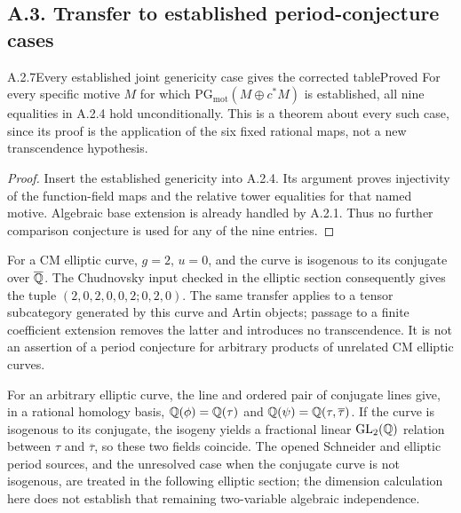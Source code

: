 \subsection{A.3. Transfer to established period-conjecture cases}

\begin{result}{A.2.7}{Every established joint genericity case gives the corrected table}{Proved}
For every specific motive $M$ for which
$\mathrm{PG}_{\mathrm{mot}}(M\oplus c^*M)$ is established, all nine
equalities in A.2.4 hold unconditionally. This is a theorem about
every such case, since its proof is the application of the six
fixed rational maps, not a new transcendence hypothesis.
\end{result}
\begin{proof}
Insert the established genericity into A.2.4. Its argument proves
injectivity of the function-field maps and the relative tower
equalities for that named motive. Algebraic base extension is
already handled by A.2.1. Thus no further comparison conjecture
is used for any of the nine entries.
\end{proof}

For a CM elliptic curve, $g=2$, $u=0$, and the curve is isogenous
to its conjugate over $\overline{\mathbb Q}$. The Chudnovsky input checked in the
elliptic section consequently gives the tuple
$(2,0,2,0,0,2;0,2,0)$. The same transfer applies to a tensor
subcategory generated by this curve and Artin objects; passage to
a finite coefficient extension removes the latter and introduces
no transcendence. It is not an assertion of a period conjecture
for arbitrary products of unrelated CM elliptic curves.

For an arbitrary elliptic curve, the line and ordered pair of
conjugate lines give, in a rational homology basis,
$\mathbb Q(\phi)=\mathbb Q(\tau)$ and
$\mathbb Q(\psi)=\mathbb Q(\tau,\overline\tau)$. If the curve is isogenous
to its conjugate, the isogeny yields a fractional linear
$\operatorname{GL}_2(\mathbb Q)$ relation between $\tau$ and $\overline\tau$, so
these two fields coincide. The opened Schneider and elliptic
period sources, and the unresolved case when the conjugate curve
is not isogenous, are treated in the following elliptic section;
the dimension calculation here does not establish that remaining
two-variable algebraic independence.
